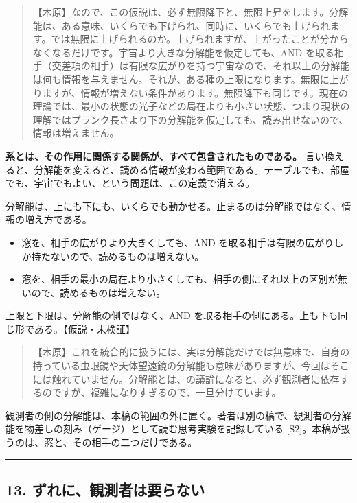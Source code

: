 \documentclass[
  a4paper,
]{ltjsarticle}
\providecommand{\tightlist}{%
  \setlength{\itemsep}{0pt}\setlength{\parskip}{0pt}}
\begin{document}
\begin{quote}
【木原】なので、この仮説は、必ず無限降下と、無限上昇をします。分解能は、ある意味、いくらでも下げられ、同時に、いくらでも上げられます。では無限に上げられるのか。上げられますが、上がったことが分からなくなるだけです。宇宙より大きな分解能を仮定しても、AND
を取る相手（交差項の相手）は有限な広がりを持つ宇宙なので、それ以上の分解能は何も情報を与えません。それが、ある種の上限になります。無限に上がりますが、情報が増えない条件があります。無限降下も同じです。現在の理論では、最小の状態の光子などの局在よりも小さい状態、つまり現状の理解ではプランク長さより下の分解能を仮定しても、読み出せないので、情報は増えません。
\end{quote}

\textbf{系とは、その作用に関係する関係が、すべて包含されたものである。}
言い換えると、分解能を変えると、読める情報が変わる範囲である。テーブルでも、部屋でも、宇宙でもよい、という問題は、この定義で消える。

分解能は、上にも下にも、いくらでも動かせる。止まるのは分解能ではなく、情報の増え方である。

\begin{itemize}
\tightlist
\item
  窓を、相手の広がりより大きくしても、AND
  を取る相手は有限の広がりしか持たないので、読めるものは増えない。
\item
  窓を、相手の最小の局在より小さくしても、相手の側にそれ以上の区別が無いので、読めるものは増えない。
\end{itemize}

上限と下限は、分解能の側ではなく、AND
を取る相手の側にある。上も下も同じ形である。【仮説・未検証】

\begin{quote}
【木原】これを統合的に扱うには、実は分解能だけでは無意味で、自身の持っている虫眼鏡や天体望遠鏡の分解能も意味がありますが、今回はそこには触れていません。分解能とは、の議論になると、必ず観測者に依存するのですが、複雑になりすぎるので、一旦分けています。
\end{quote}

観測者の側の分解能は、本稿の範囲の外に置く。著者は別の稿で、観測者の分解能を物差しの刻み（ゲージ）として読む思考実験を記録している
{[}S2{]}。本稿が扱うのは、窓と、その相手の二つだけである。

\begin{center}\rule{0.5\linewidth}{0.5pt}\end{center}

\subsection{13.
ずれに、観測者は要らない}\label{ux305aux308cux306bux89b3ux6e2cux8005ux306fux8981ux3089ux306aux3044}
\end{document}
